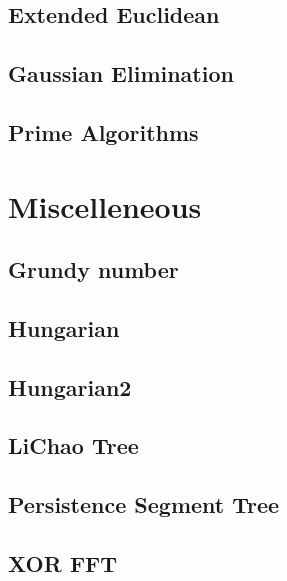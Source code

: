 \documentclass[10pt,landscape,a4paper,twocolumn]{article}
\begin{document}
\subsection{Extended Euclidean}


\subsection{Gaussian Elimination}


\subsection{Prime Algorithms}



\section{Miscelleneous}
\subsection{Grundy number}


\subsection{Hungarian}


\subsection{Hungarian2}


\subsection{LiChao Tree}


\subsection{Persistence Segment Tree}


\subsection{XOR FFT}

\end{document}
